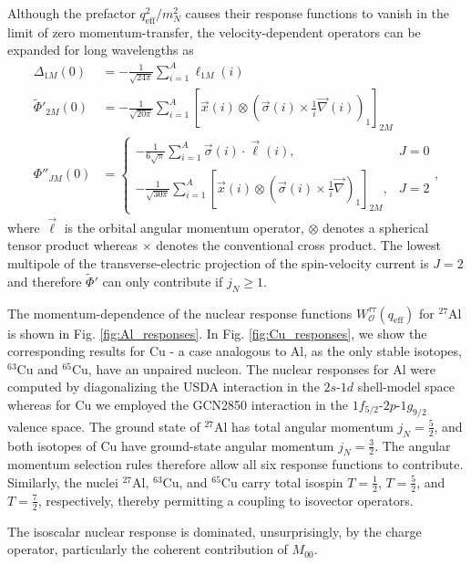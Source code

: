 \documentclass{book}[12pt]
\begin{document}
Although the prefactor $q_\mathrm{eff}^2/m_N^2$ causes their response functions to vanish in the limit of zero momentum-transfer, the velocity-dependent operators can be expanded for long wavelengths as
\begin{equation}
\begin{split}
\Delta_{1M}(0)&=-\frac{1}{\sqrt{24\pi}}\sum_{i=1}^A\ell_{1M}(i)\\
\tilde{\Phi}'_{2M}(0)&=-\frac{1}{\sqrt{20\pi}}\sum_{i=1}^A\left[\vec{x}(i)\otimes\left(\vec{\sigma}(i)\times\frac{1}{i}\vec{\nabla}(i)\right)_1\right]_{2M}\\
\Phi''_{JM}(0)&=\left\{\begin{array}{cc}
-\frac{1}{6\sqrt{\pi}}\sum_{i=1}^A\vec{\sigma}(i)\cdot\vec{\ell}(i), & J=0\\
-\frac{1}{\sqrt{30\pi}}\sum_{i=1}^A\left[\vec{x}(i)\otimes\left(\vec{\sigma}(i)\times\frac{1}{i}\vec{\nabla}\right)_1\right]_{2M}, & J=2
\end{array}\right.,
\end{split}
\end{equation}
where $\vec{\ell}$ is the orbital angular momentum operator, $\otimes$ denotes a spherical tensor product whereas $\times$ denotes the conventional cross product. The lowest multipole of the transverse-electric projection of the spin-velocity current is $J=2$ and therefore $\tilde{\Phi}'$ can only contribute if $j_N\geq 1$.

The momentum-dependence of the nuclear response functions $W^{\tau\tau}_\mathcal{O}(q_\mathrm{eff})$ for $^{27}$Al is shown in Fig. \ref{fig:Al_responses}. In Fig. \ref{fig:Cu_responses}, we show the corresponding results for Cu - a case analogous to Al, as the only stable isotopes, $^{63}$Cu and $^{65}$Cu, have an unpaired nucleon. The nuclear responses for Al were computed by diagonalizing the USDA interaction in the $2s$-$1d$ shell-model space whereas for Cu we employed the GCN2850 interaction in the $1f_{5/2}$-$2p$-$1g_{9/2}$ valence space. The ground state of $^{27}$Al has total angular momentum $j_N=\frac{5}{2}$, and both isotopes of Cu have ground-state angular momentum $j_N=\frac{3}{2}$. The angular momentum selection rules therefore allow all six response functions to contribute. Similarly, the nuclei $^{27}$Al, $^{63}$Cu, and $^{65}$Cu carry total isospin $T=\frac{1}{2}$, $T=\frac{5}{2}$, and $T=\frac{7}{2}$, respectively, thereby permitting a coupling to isovector operators.

The isoscalar nuclear response is dominated, unsurprisingly, by the charge operator, particularly the coherent contribution of $M_{00}$. 
\end{document}
